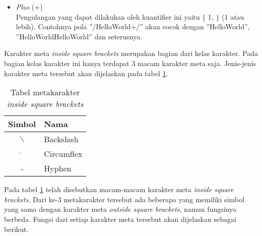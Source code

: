 \begin{enumerate}
\begin{itemize}
		\item \textit{Plus} (+) \\
		Pengulangan yang dapat dilakukan oleh kuantifier ini yaitu $\lbrace$ 1, $\rbrace$ (1 atau lebih). Contohnya pola ''/HelloWorld+/'' akan cocok dengan ''HelloWorld'', ''HelloWorldHelloWorld'' dan seterusnya.
	\end{itemize}	 
	
\end{enumerate}
		
Karakter meta \textit{inside square brackets} merupakan bagian dari kelas karakter. Pada bagian kelas karakter ini hanya terdapat 3 macam karakter meta saja. Jenis-jenis karakter meta tersebut akan dijelaskan pada tabel \ref{tab:metacharacters-inside}.
		
\begin{table}[H]
	\renewcommand{\arraystretch}{1.5}
	\caption {Tabel metakarakter \textit{inside square brackets}} 
	\label{tab:metacharacters-inside}
	\begin{center}
		\begin{tabular}{|c|l|}
		\hline 
		Simbol & Nama \\ 
		\hline 
		$\backslash$ & Backslash \\ 
		\hline 
		$\hat{}$ & Circumflex \\ 
		\hline 
		- & Hyphen \\ 
		\hline
		\end{tabular}
	\end{center}
\end{table}

Pada tabel \ref{tab:metacharacters-inside} telah disebutkan macam-macam karakter meta \textit{inside square brackets}. Dari ke-3 metakarakter tersebut ada beberapa yang memiliki simbol yang sama dengan karakter meta \textit{outside square brackets}, namun fungsinya berbeda. Fungsi dari setiap karakter meta tersebut akan dijelaskan sebagai berikut.

